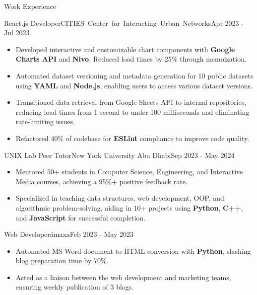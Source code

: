 \documentclass[]{mcdowellcv}
\begin{document}
	\begin{cvsection}{Work Experience}
		\begin{cvsubsection}{React.js Developer}{\mbox{\hspace{-1.2cm}CITIES Center for Interacting Urban Networks}}{Apr 2023 - Jul 2023}			
			\begin{itemize}
				\item Developed interactive and customizable chart components with \textbf{Google Charts API} and \textbf{Nivo}. Reduced load times by 25\% through memoization.
				\item Automated dataset versioning and metadata generation for 10 public datasets using \textbf{YAML} and \textbf{Node.js}, enabling users to access various dataset versions.
				\item Transitioned data retrieval from Google Sheets API to internal repositories, reducing load times from 1 second to under 100 milliseconds and eliminating rate-limiting issues.
				\item Refactored 40\% of codebase for \textbf{ESLint} compliance to improve code quality.
			\end{itemize}
		\end{cvsubsection}
		
		\vspace{-0.1cm}
		
		\begin{cvsubsection}{UNIX Lab Peer Tutor}{New York University Abu Dhabi}{Sep 2023 - May 2024}			
			\begin{itemize}
				\item Mentored 50+ students in Computer Science, Engineering, and Interactive Media courses, achieving a 95\%+ positive feedback rate.
				\item Specialized in teaching data structures, web development, OOP, and algorithmic problem-solving, aiding in 10+ projects using \textbf{Python}, \textbf{C++}, and \textbf{JavaScript} for successful completion.
			\end{itemize}
		\end{cvsubsection}
		
		\vspace{-0.1cm}
		
	\begin{cvsubsection}{Web Developer}{ámaxa}{Feb 2023 - May 2023}			
			\begin{itemize}
				\item Automated MS Word document to HTML conversion with \textbf{Python}, slashing blog preparation time by 70\%.
				\item Acted as a liaison between the web development and marketing teams, ensuring weekly publication of 3 blogs.
			\end{itemize}
		\end{cvsubsection}
	\end{cvsection}
	
\end{document}

